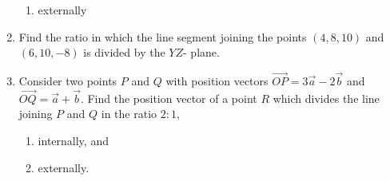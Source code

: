 \begin{enumerate}[label=\thesubsection.\arabic*,ref=\thesubsection.\theenumi]
\begin{enumerate}[label=(\roman*)]
\item externally
\end{enumerate}
\item Find the ratio in which the line segment joining the points $(4,8,10)$ and $(6,10,-8)$ is divided by the $YZ$- plane.
\item Consider two points $P$ and $Q$ with position vectors $\overrightarrow{OP} = 3\overrightarrow{a}-2\overrightarrow{b}$ and $\overrightarrow{OQ}=\overrightarrow{a}+\overrightarrow{b}$. Find the position vector of a point $R$ which divides the line joining $P$ and $Q$ in the ratio $2:1$, 
\begin{enumerate}
\item internally, and 
\item externally.
\end{enumerate}
\end{enumerate}
